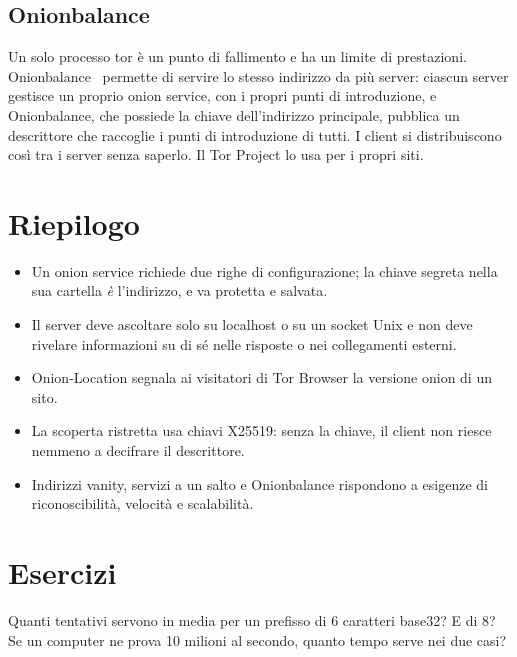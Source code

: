 \subsection{Onionbalance}

Un solo processo tor è un punto di fallimento e ha un limite di prestazioni. Onionbalance~\cite{onionbalance} permette di servire lo stesso indirizzo da più server: ciascun server gestisce un proprio onion service, con i propri punti di introduzione, e Onionbalance, che possiede la chiave dell'indirizzo principale, pubblica un descrittore che raccoglie i punti di introduzione di tutti. I client si distribuiscono così tra i server senza saperlo. Il Tor Project lo usa per i propri siti.

\section*{Riepilogo}
\begin{itemize}
  \item Un onion service richiede due righe di configurazione; la chiave segreta nella sua cartella \emph{è} l'indirizzo, e va protetta e salvata.
  \item Il server deve ascoltare solo su localhost o su un socket Unix e non deve rivelare informazioni su di sé nelle risposte o nei collegamenti esterni.
  \item Onion-Location segnala ai visitatori di Tor Browser la versione onion di un sito.
  \item La scoperta ristretta usa chiavi X25519: senza la chiave, il client non riesce nemmeno a decifrare il descrittore.
  \item Indirizzi vanity, servizi a un salto e Onionbalance rispondono a esigenze di riconoscibilità, velocità e scalabilità.
\end{itemize}

\section*{Esercizi}

\begin{esercizio}[1]\label{es:21-vanity}
Quanti tentativi servono in media per un prefisso di 6 caratteri base32? E di 8? Se un computer ne prova 10 milioni al secondo, quanto tempo serve nei due casi?
\end{esercizio}

